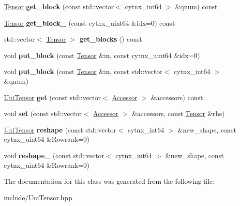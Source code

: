 \begin{DoxyCompactItemize}
\hyperlink{classcytnx_1_1Tensor}{Tensor} {\bfseries get\+\_\+block} (const std\+::vector$<$ cytnx\+\_\+int64 $>$ \&qnum) const
\item 
\mbox{\label{classcytnx_1_1UniTensor_a216d54f936554fa11b1edaff968d69d4}} 
\hyperlink{classcytnx_1_1Tensor}{Tensor} {\bfseries get\+\_\+block\+\_\+} (const cytnx\+\_\+uint64 \&idx=0) const
\item 
\mbox{\label{classcytnx_1_1UniTensor_a661bc7073dc51b16a4b9802bbcc3cba2}} 
std\+::vector$<$ \hyperlink{classcytnx_1_1Tensor}{Tensor} $>$ {\bfseries get\+\_\+blocks} () const
\item 
\mbox{\label{classcytnx_1_1UniTensor_abcd3008bf05771f0623ce1ef80b1085a}} 
void {\bfseries put\+\_\+block} (const \hyperlink{classcytnx_1_1Tensor}{Tensor} \&in, const cytnx\+\_\+uint64 \&idx=0)
\item 
\mbox{\label{classcytnx_1_1UniTensor_a9bf19662043d456a89a8e51215c67beb}} 
void {\bfseries put\+\_\+block} (const \hyperlink{classcytnx_1_1Tensor}{Tensor} \&in, const std\+::vector$<$ cytnx\+\_\+int64 $>$ \&qnum)
\item 
\mbox{\label{classcytnx_1_1UniTensor_a2e2d7f3137bb1cfb26e6a19acbc9563e}} 
\hyperlink{classcytnx_1_1UniTensor}{Uni\+Tensor} {\bfseries get} (const std\+::vector$<$ \hyperlink{classcytnx_1_1Accessor}{Accessor} $>$ \&accessors) const
\item 
\mbox{\label{classcytnx_1_1UniTensor_a90ba42a96ac324dfea7436d383fecc79}} 
void {\bfseries set} (const std\+::vector$<$ \hyperlink{classcytnx_1_1Accessor}{Accessor} $>$ \&accessors, const \hyperlink{classcytnx_1_1Tensor}{Tensor} \&rhs)
\item 
\mbox{\label{classcytnx_1_1UniTensor_a6c749dc601952c239225903371ddb669}} 
\hyperlink{classcytnx_1_1UniTensor}{Uni\+Tensor} {\bfseries reshape} (const std\+::vector$<$ cytnx\+\_\+int64 $>$ \&new\+\_\+shape, const cytnx\+\_\+uint64 \&Rowrank=0)
\item 
\mbox{\label{classcytnx_1_1UniTensor_aa1047de2e99ac2abd79ff4f74145d543}} 
void {\bfseries reshape\+\_\+} (const std\+::vector$<$ cytnx\+\_\+int64 $>$ \&new\+\_\+shape, const cytnx\+\_\+uint64 \&Rowrank=0)
\end{DoxyCompactItemize}


The documentation for this class was generated from the following file\+:\begin{DoxyCompactItemize}
\item 
include/Uni\+Tensor.\+hpp\end{DoxyCompactItemize}
